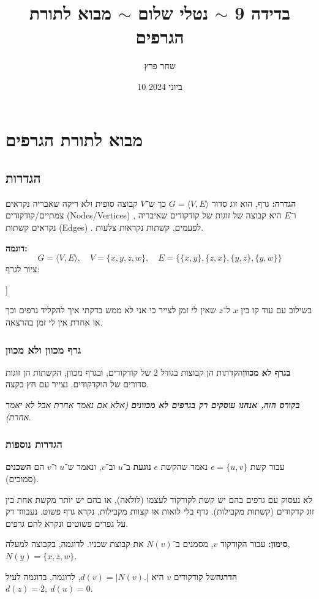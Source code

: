 \documentclass[]{article}
\author{שחר פרץ}
\title{בדידה 9 $\sim$ נטלי שלום $\sim$ מבוא לתורת הגרפים}
\date{10 ביוני 2024}
\newcommand\del   {$ \!\! $}
\newcommand\ra    {\rangle}
\newcommand\la    {\langle}
\newcommand\sof[1]    {\left | #1 \right |}
\begin{document}
	\maketitle
	
	\section{מבוא לתורת הגרפים}
	\subsection{הגדרות}
	\textbf{הגדרה: }גרף, הוא זוג סדור $G = \la V, E \ra$ כך ש־$V$ קבוצה סופית ולא ריקה שאבריה נקראים צמתיים/קודקודים (Nodes/Vertices) \del, ו־$E$ היא קבוצה של זוגות של קודקודים שאיבריה נקראים קשתות (Edges) \del. לפעמים, קשתות נקראות צלעות. 
	
	\textbf{דוגמה: }
	\[ G = \la V, E \ra, \quad V = \{x, y, z, w\}, \quad E = \{\{x, y\}, \{z, x\}, \{y, z\}, \{y, w\}\} \]
	ציור לגרף: 
	\begin{forest}
		[y [x] [z] [w]]
	\end{forest}
	בשילוב עם עוד קו בין $x$ ל־$z$ שאין לי זמן לצייר כי אני לא ממש בדקתי איך להקליד גרפים וכך או אחרת אין לי זמן בהרצאה. 
	
	\subsubsection{גרף מכוון ולא מכוון}
	\textbf{בגרף לא מכוון}הקדתות הן קבוצות בגודל $2$ של קודקודים, ובגרף מכוון, הקשתות הן זוגות סדורים של הוקדקודים. נצייר עם חץ בקצה. 
	
	\textit{\textbf{בקורס הזה, אנחנו עוסקים רק בגרפים לא מכוונים} (אלא אם נאמר אחרת אבל לא יאמר אחרת)}. 
	
	\subsubsection{הגדרות נוספות}
	עבור קשת $e = \{u, v\}$ נאמר שהקשת $e$ \textbf{נוגעת} ב־$u$ וב־$v$, ונאמר ש־$u$ ו־$v$ הם \textbf{השכנים} (סמוכים). 
	
	לא נעסוק עם גרפים בהם יש קשת לקודקוד לעצמו (לולאה), או בהם יש יותר מקשת אחת בין זוג קדקודים (קשתות מקבילות). גרף בלי לואות או קצוות מקבילות, נקרא גרף פשוט. נעבווד רק על גפרים פשוטים ונקרא להם גרפים. 
	
	\textbf{סימון: }עבור הקודקוד $v$, מסמנים ב־$N(v)$ את קבוצת שכניו. לדוגמה, בקבוצה למעלה, $N(y) = \{x, z, w\}$. 
	
	\textbf{הדרגה}של קודקודים $v$ היא $d(v) = \sof{N(v). }$, לדוגמה, בדוגמה לעיל $d(z) = 2, \ d(u) = 0$. 
	
\end{document}
